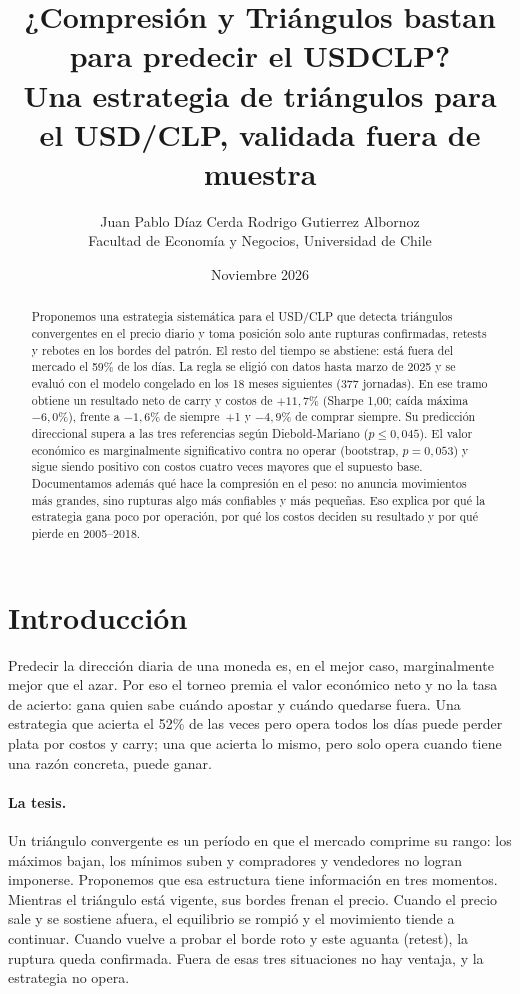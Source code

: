 \documentclass[10pt,a4paper]{article}
\title{\textbf{¿Compresión y Triángulos bastan para predecir el USDCLP?}\\[2pt]
\large Una estrategia de triángulos para el USD/CLP, validada fuera de muestra}
\author{Juan Pablo Díaz Cerda \qquad Rodrigo Gutierrez Albornoz\\
\small Facultad de Economía y Negocios, Universidad de Chile}
\date{Noviembre 2026}
\begin{document}
\maketitle

\begin{abstract}
Proponemos una estrategia sistemática para el USD/CLP que detecta triángulos
convergentes en el precio diario y toma posición solo ante rupturas confirmadas,
retests y rebotes en los bordes del patrón. El resto del tiempo se abstiene: está
fuera del mercado el 59\% de los días. La regla se eligió con datos hasta marzo de
2025 y se evaluó con el modelo congelado en los 18 meses siguientes (377 jornadas).
En ese tramo obtiene un resultado neto de carry y costos de $+11{,}7\%$ (Sharpe
1,00; caída máxima $-6{,}0\%$), frente a $-1{,}6\%$ de siempre~+1 y $-4{,}9\%$ de
comprar siempre. Su predicción direccional supera a las tres referencias según
Diebold-Mariano ($p\le0{,}045$). El valor económico es marginalmente significativo
contra no operar (bootstrap, $p=0{,}053$) y sigue siendo positivo con costos cuatro
veces mayores que el supuesto base. Documentamos además qué hace la compresión en
el peso: no anuncia movimientos más grandes, sino rupturas algo más confiables y
más pequeñas. Eso explica por qué la estrategia gana poco por operación, por qué
los costos deciden su resultado y por qué pierde en 2005--2018.
\end{abstract}

\section{Introducción}

Predecir la dirección diaria de una moneda es, en el mejor caso, marginalmente
mejor que el azar. Por eso el torneo premia el valor económico neto y no la tasa
de acierto: gana quien sabe cuándo apostar y cuándo quedarse fuera. Una estrategia
que acierta el 52\% de las veces pero opera todos los días puede perder plata por
costos y carry; una que acierta lo mismo, pero solo opera cuando tiene una razón
concreta, puede ganar.

\paragraph{La tesis.} Un triángulo convergente es un período en que el mercado
comprime su rango: los máximos bajan, los mínimos suben y compradores y vendedores
no logran imponerse. Proponemos que esa estructura tiene información en tres
momentos. Mientras el triángulo está vigente, sus bordes frenan el precio. Cuando
el precio sale y se sostiene afuera, el equilibrio se rompió y el movimiento tiende
a continuar. Cuando vuelve a probar el borde roto y este aguanta (retest), la
ruptura queda confirmada. Fuera de esas tres situaciones no hay ventaja, y la
estrategia no opera.
\end{document}
